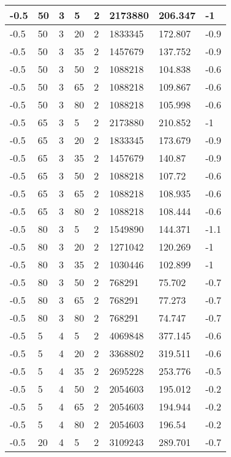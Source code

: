 \begin{longtable}{|p{1.4cm}|p{1.4cm}|p{1.4cm}|p{1.4cm}|p{1.4cm}|p{1.4cm}|p{1.4cm}|p{1.5cm}|}
        -0.5 & 50 & 3 & 5 & 2 & 2173880 & 206.347 & -1 \\ \hline
        -0.5 & 50 & 3 & 20 & 2 & 1833345 & 172.807 & -0.9 \\ \hline
        -0.5 & 50 & 3 & 35 & 2 & 1457679 & 137.752 & -0.9 \\ \hline
        -0.5 & 50 & 3 & 50 & 2 & 1088218 & 104.838 & -0.6 \\ \hline
        -0.5 & 50 & 3 & 65 & 2 & 1088218 & 109.867 & -0.6 \\ \hline
        -0.5 & 50 & 3 & 80 & 2 & 1088218 & 105.998 & -0.6 \\ \hline
        -0.5 & 65 & 3 & 5 & 2 & 2173880 & 210.852 & -1 \\ \hline
        -0.5 & 65 & 3 & 20 & 2 & 1833345 & 173.679 & -0.9 \\ \hline
        -0.5 & 65 & 3 & 35 & 2 & 1457679 & 140.87 & -0.9 \\ \hline
        -0.5 & 65 & 3 & 50 & 2 & 1088218 & 107.72 & -0.6 \\ \hline
        -0.5 & 65 & 3 & 65 & 2 & 1088218 & 108.935 & -0.6 \\ \hline
        -0.5 & 65 & 3 & 80 & 2 & 1088218 & 108.444 & -0.6 \\ \hline
        -0.5 & 80 & 3 & 5 & 2 & 1549890 & 144.371 & -1.1 \\ \hline
        -0.5 & 80 & 3 & 20 & 2 & 1271042 & 120.269 & -1 \\ \hline
        -0.5 & 80 & 3 & 35 & 2 & 1030446 & 102.899 & -1 \\ \hline
        -0.5 & 80 & 3 & 50 & 2 & 768291 & 75.702 & -0.7 \\ \hline
        -0.5 & 80 & 3 & 65 & 2 & 768291 & 77.273 & -0.7 \\ \hline
        -0.5 & 80 & 3 & 80 & 2 & 768291 & 74.747 & -0.7 \\ \hline
        -0.5 & 5 & 4 & 5 & 2 & 4069848 & 377.145 & -0.6 \\ \hline
        -0.5 & 5 & 4 & 20 & 2 & 3368802 & 319.511 & -0.6 \\ \hline
        -0.5 & 5 & 4 & 35 & 2 & 2695228 & 253.776 & -0.5 \\ \hline
        -0.5 & 5 & 4 & 50 & 2 & 2054603 & 195.012 & -0.2 \\ \hline
        -0.5 & 5 & 4 & 65 & 2 & 2054603 & 194.944 & -0.2 \\ \hline
        -0.5 & 5 & 4 & 80 & 2 & 2054603 & 196.54 & -0.2 \\ \hline
        -0.5 & 20 & 4 & 5 & 2 & 3109243 & 289.701 & -0.7 \\ \hline

\end{longtable}
